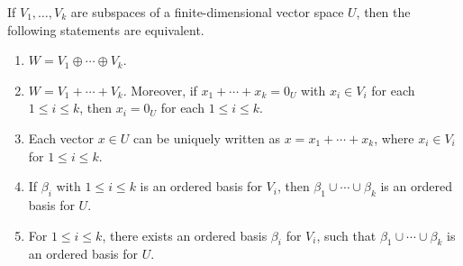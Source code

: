 \begin{theorem}
  If $V_1, \dots, V_k$ are subspaces of a finite-dimensional vector space $U$,
  then the following statements are equivalent.
  \begin{enumerate}
    \item $W = V_1 \oplus \cdots \oplus V_k$.
    \item $W = V_1 + \cdots + V_k$.
    Moreover, if $x_1 + \cdots + x_k = 0_U$ with $x_i \in V_i$ for each
    $1 \leq i \leq k$, then $x_i = 0_U$ for each $1 \leq i \leq k$.
    \item Each vector $x \in U$ can be uniquely written as
    $x = x_1 + \cdots + x_k$, where $x_i \in V_i$ for $1 \leq i \leq k$.
    \item If $\beta_i$ with $1 \leq i \leq k$ is an ordered basis for $V_i$,
    then $\beta_1 \cup \cdots \cup \beta_k$ is an ordered basis for $U$.
    \item For $1 \leq i \leq k$, there exists an ordered basis $\beta_i$ for
    $V_i$, such that $\beta_1 \cup \cdots \cup \beta_k$ is an ordered basis for
    $U$.
  \end{enumerate}
\end{theorem}
